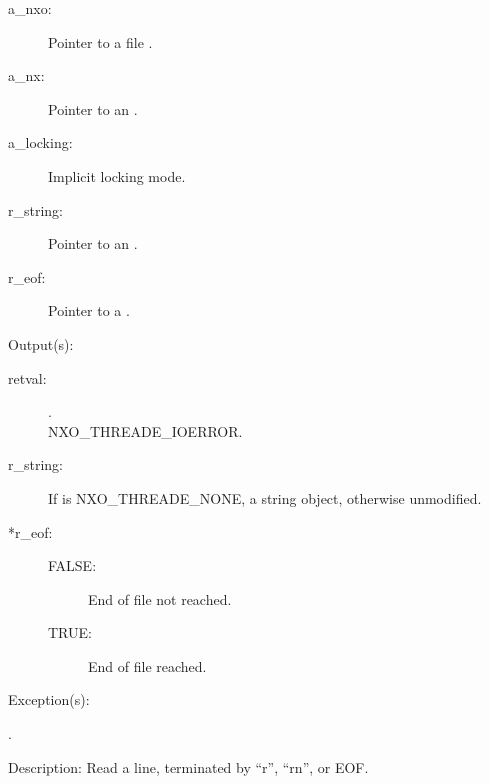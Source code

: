 \begin{capi}
\begin{capilist}
		\begin{description}\item[]
		\item[a\_nxo: ]
			Pointer to a file .
		\item[a\_nx: ]
			Pointer to an .
		\item[a\_locking: ]
			Implicit locking mode.
		\item[r\_string: ]
			Pointer to an .
		\item[r\_eof: ]
			Pointer to a .
		\end{description}
	\item[Output(s): ]
		\begin{description}\item[]
		\item[retval: ]
			\begin{description}\item[]
			\item[.]
			\item[
				{NXO_THREADE_IOERROR}.]
			\end{description}
		\item[r\_string: ]
			If  is NXO\_THREADE\_NONE, a string object,
			otherwise unmodified.
		\item[*r\_eof: ]
			\begin{description}\item[]
			\item[FALSE: ]
				End of file not reached.
			\item[TRUE: ]
				End of file reached.
			\end{description}
		\end{description}
	\item[Exception(s): ]
		\begin{description}\item[]
		\item[.]
		\end{description}
	\item[Description: ]
		Read a line, terminated by ``{\bs}r'', ``{\bs}r{\bs}n'', or EOF.
	\end{capilist}
\label{nxo_file_write}
	\begin{capilist}

\end{capilist}
\end{capi}
